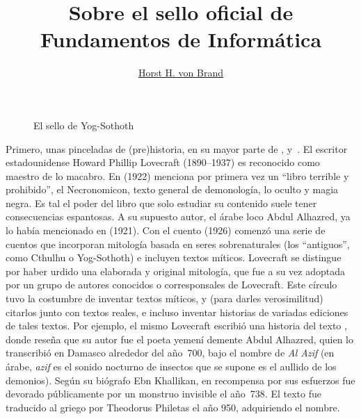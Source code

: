 \documentclass[spanish, english, greek]{article}
\title{Sobre el sello oficial de\\
       Fundamentos de Informática}
\author{\href{mailro:vonbrand@inf.utfsm.cl}{Horst H. von Brand}}
\begin{document}


\maketitle
\thispagestyle{empty}

  \begin{figure}[ht]
    \centering
    \caption{El sello de Yog-Sothoth}
    \label{fig:sigil}
  \end{figure}
  Primero,
  unas pinceladas de (pre)historia,
  en su mayor parte de \cite{SDSAB:_necronomicon_real},
  \cite{Wikipedia14:_necronomicon}
  y~\cite{gilmore03:_necronomicon_facts}.
  El escritor estadounidense Howard Phillip Lovecraft
  (1890--1937)
  es reconocido como maestro de lo macabro.
  En  (1922)
  menciona por primera vez
  un ``libro terrible y prohibido'',
  el Necronomicon,
  texto general de demonología,
  lo oculto y magia negra.
  Es tal el poder del libro que solo estudiar su contenido
  suele tener consecuencias espantosas.
  A su supuesto autor,
  el árabe loco Abdul Alhazred,
  ya lo había mencionado en 
  (1921).
  Con el cuento 
  (1926)
  comenzó una serie de cuentos
  que incorporan mitología basada en seres sobrenaturales
  (los ``antiguos'',
   como Cthulhu o Yog-Sothoth)
  e incluyen textos míticos.
  Lovecraft se distingue por haber urdido una elaborada y original mitología,
  que fue a su vez adoptada por un grupo de autores
  conocidos o corresponsales de Lovecraft.
  Este círculo tuvo la costumbre de inventar textos míticos,
  y
  (para darles verosimilitud)
  citarlos junto con textos reales,
  e incluso inventar historias de variadas ediciones de tales textos.
  Por ejemplo,
  el mismo Lovecraft escribió una historia del texto %
    \cite{lovecraft38:_history_necronomicon},
  donde reseña que su autor fue el poeta yemení demente Abdul Alhazred,
  quien lo transcribió en Damasco alrededor del año~700,
  bajo el nombre de \emph{Al Azif}
  (en árabe,
   \emph{azif} es el sonido nocturno de insectos que se supone es el aullido
   de los demonios).
  Según su biógrafo Ebn Khallikan,
  en recompensa por sus esfuerzos fue devorado públicamente
  por un monstruo invisible el año~738.
  El texto fue traducido al griego por Theodorus Philetas el año 950,
  adquiriendo el nombre.
\end{document}
